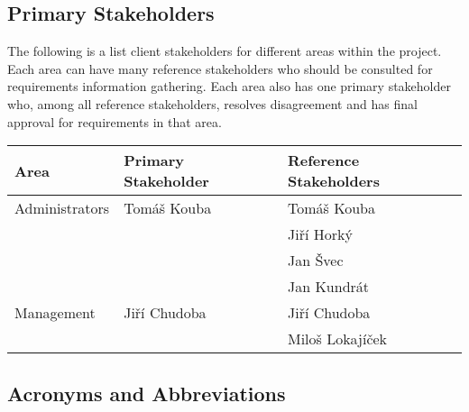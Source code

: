 \documentclass[12pt]{article}
\begin{document}
\subsection{Primary Stakeholders}
The following is a list client stakeholders for different areas within the project. Each area can have many reference stakeholders 
who should be consulted for requirements information gathering. Each area also has one primary stakeholder who, among all reference 
stakeholders, resolves disagreement and has final approval for requirements in that area.

\begin{table}[!h]
	\begin{tabular}{| l | l | l |}
		\hline
		\textbf{Area}		& \textbf{Primary Stakeholder} & \textbf{Reference Stakeholders}\\
        \hline
        Administrators	& Tomáš Kouba           & Tomáš Kouba\\
                          & & Jiří Horký\\
                          & & Jan Švec\\
                          & & Jan Kundrát\\
        \hline
        Management	& Jiří Chudoba           & Jiří Chudoba\\
                          & & Miloš Lokajíček\\
        \hline
	\end{tabular}
	\label{tab:PrimaryStakeholders}
\end{table}

\subsection{Acronyms and Abbreviations}
\end{document}
